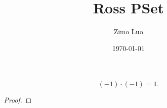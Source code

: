 \documentclass[11pt]{amsart}
\title{Ross PSet}
\date{\today}
\author{Zimo Luo}
\begin{document}
\maketitle
\begin{Prob}{1}
\[
(-1)\cdot (-1) = 1. 
\]
\end{Prob}
\begin{proof}

    

\end{proof}
\end{document}
